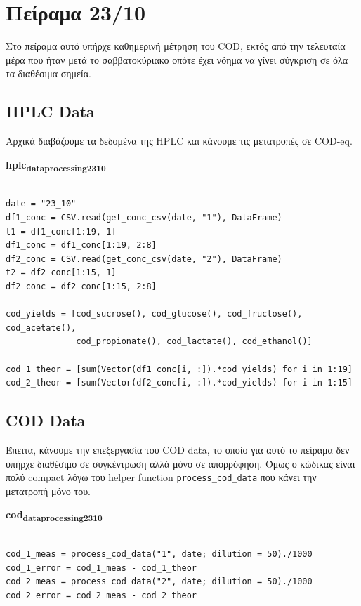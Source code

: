\documentclass[11pt]{article}
\begin{document}
\section{Πείραμα 23/10}
\label{sec:orgbf738f4}
Στο πείραμα αυτό υπήρχε καθημερινή μέτρηση του COD, εκτός από την τελευταία μέρα που ήταν μετά το σαββατοκύριακο οπότε έχει νόημα να γίνει σύγκριση σε όλα τα διαθέσιμα σημεία.

\subsection{HPLC Data}
\label{sec:org3c6643d}
Αρχικά διαβάζουμε τα δεδομένα της HPLC και κάνουμε τις μετατροπές σε COD-eq.

\textbf{hplc\textsubscript{data}\textsubscript{processing}\textsubscript{23}\textsubscript{10}}
\begin{verbatim}

date = "23_10"
df1_conc = CSV.read(get_conc_csv(date, "1"), DataFrame)
t1 = df1_conc[1:19, 1]
df1_conc = df1_conc[1:19, 2:8]
df2_conc = CSV.read(get_conc_csv(date, "2"), DataFrame)
t2 = df2_conc[1:15, 1]
df2_conc = df2_conc[1:15, 2:8]

cod_yields = [cod_sucrose(), cod_glucose(), cod_fructose(), cod_acetate(),
              cod_propionate(), cod_lactate(), cod_ethanol()]

cod_1_theor = [sum(Vector(df1_conc[i, :]).*cod_yields) for i in 1:19]
cod_2_theor = [sum(Vector(df2_conc[i, :]).*cod_yields) for i in 1:15]

\end{verbatim}

\subsection{COD Data}
\label{sec:orga1f787e}
Έπειτα, κάνουμε την επεξεργασία του COD data, το οποίο για αυτό το πείραμα δεν υπήρχε διαθέσιμο σε συγκέντρωση αλλά μόνο σε απορρόφηση. Όμως ο κώδικας είναι πολύ compact λόγω του helper function \texttt{process\_cod\_data} που κάνει την μετατροπή μόνο του.

\textbf{cod\textsubscript{data}\textsubscript{processing}\textsubscript{23}\textsubscript{10}}
\begin{verbatim}

cod_1_meas = process_cod_data("1", date; dilution = 50)./1000
cod_1_error = cod_1_meas - cod_1_theor
cod_2_meas = process_cod_data("2", date; dilution = 50)./1000
cod_2_error = cod_2_meas - cod_2_theor

\end{verbatim}
\end{document}
